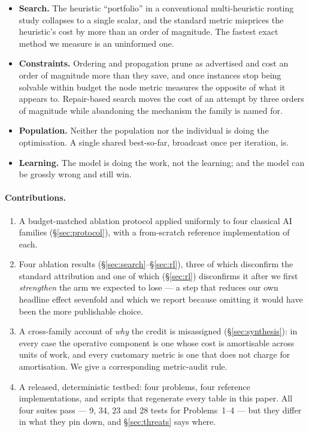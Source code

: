 \documentclass[11pt]{article}
\begin{document}
\begin{itemize}[leftmargin=1.4em, itemsep=2pt]
\item \textbf{Search.} The heuristic ``portfolio'' in a conventional multi-heuristic routing study
  collapses to a single scalar, and the standard metric misprices the heuristic's cost by more than
  an order of magnitude. The fastest exact method we measure is an uninformed one.
\item \textbf{Constraints.} Ordering and propagation prune as advertised and cost an order of
  magnitude more than they save, and once instances stop being solvable within budget the node
  metric measures the opposite of what it appears to. Repair-based search moves the cost of an
  attempt by three orders of magnitude while abandoning the mechanism the family is named for.
\item \textbf{Population.} Neither the population nor the individual is doing the optimisation.
  A single shared best-so-far, broadcast once per iteration, is.
\item \textbf{Learning.} The model is doing the work, not the learning; and the model can be
  grossly wrong and still win.
\end{itemize}

\paragraph{Contributions.}
\begin{enumerate}[leftmargin=1.6em, itemsep=2pt]
\item A budget-matched ablation protocol applied uniformly to four classical AI families
  (\S\ref{sec:protocol}), with a from-scratch reference implementation of each.
\item Four ablation results (\S\ref{sec:search}--\S\ref{sec:rl}), three of which disconfirm the
  standard attribution and one of which (\S\ref{sec:rl}) disconfirms it after we first
  \emph{strengthen} the arm we expected to lose --- a step that reduces our own headline effect
  sevenfold and which we report because omitting it would have been the more publishable choice.
\item A cross-family account of \emph{why} the credit is misassigned (\S\ref{sec:synthesis}): in
  every case the operative component is one whose cost is amortisable across units of work, and
  every customary metric is one that does not charge for amortisation. We give a corresponding
  metric-audit rule.
\item A released, deterministic testbed: four problems, four reference implementations, and
  scripts that regenerate every table in this paper. All four suites pass --- 9, 34, 23 and 28
  tests for Problems~1--4 --- but they differ in what they pin down, and \S\ref{sec:threats} says
  where.
\end{enumerate}
\end{document}
